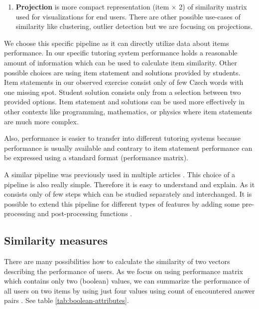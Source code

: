 \documentclass[
  digital, %
  table,   %
  nolof,     %
  nolot,     %
  nocover,
  color,
  final, %
]{fithesis3}
\begin{document}
\begin{enumerate}
  \item
    \textbf{Projection} is more compact representation (item $\times$ 2) of similarity matrix used for visualizations for end users. There are other possible use-cases of similarity like clustering, outlier detection but we are focusing on projections.
\end{enumerate}


We choose this specific pipeline as it can directly utilize data about items performance. In our specific tutoring system performance holds a reasonable amount of information which can be used to calculate item similarity. Other possible choices are using item statement and solutions provided by students. Item statements in our observed exercise consist only of few Czech words with one missing spot. Student solution consists only from a selection between two provided options. Item statement and solutions can be used more effectively in other contexts like programming, mathematics, or physics where item statements are much more complex.

Also, performance is easier to transfer into different tutoring systems because performance is usually available and contrary to item statement performance can be expressed using a standard format (performance matrix).

A similar pipeline was previously used in multiple articles \cite{pelanek2018programming, kaser2013cluster}. This choice of a pipeline is also really simple. Therefore it is easy to understand and explain. As it consists only of few steps which can be studied separately and interchanged. It is possible to extend this pipeline for different types of features by adding some pre-processing and post-processing functions \cite{kaser2013cluster}.


\subsection{Similarity measures}\label{similarity-measures}

There are many possibilities how to calculate the similarity of two vectors describing the performance of users. As we focus on using performance matrix which contains only two (boolean) values, we can summarize the performance of all users on two items by using just four values using count of encountered answer pairs \cite{choi2010survey}. See table \ref{tab:boolean-attributes}.
\end{document}
